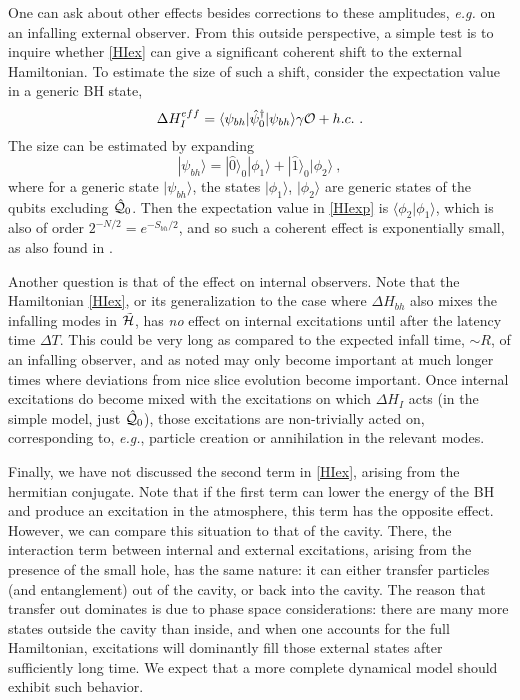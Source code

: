\documentclass[12pt]{article}
\numberwithin{equation}{section}
\newcommand{\calo}{{\cal O}}
\newcommand{\calh}{{\cal H}}
\newcommand{\calq}{{\cal Q}}
\newcommand{\beq}{\begin{equation}}
\newcommand{\eeq}{\end{equation}}
\begin{document}
One can ask about other effects besides corrections to these amplitudes, {\it e.g.} on an infalling external observer.  From this outside perspective, a simple test is to inquire whether  \eqref{HIex} can give a significant coherent shift to the external Hamiltonian.  To estimate the size of such a shift, consider the expectation value in a generic BH state,
\beq\label{HIexp}
\Delta H_I^{eff} = \langle \psi_{bh}|\hat \psi_0^\dagger| \psi_{bh}\rangle \gamma \calo + h.c.\ .
\eeq
The size can be estimated by expanding 
\beq
|\psi_{bh}\rangle = |\hat0\rangle_0 |\phi_1\rangle +  |\hat1\rangle_0  |\phi_2\rangle\ ,
\eeq
where for a generic state $|\psi_{bh}\rangle$, the states $ |\phi_1\rangle$, $ |\phi_2\rangle$ are generic states of the qubits excluding $\hat \calq_0$. Then the expectation value in \eqref{HIexp} is $\langle \phi_2|\phi_1\rangle$, which is also of order $2^{-N/2} = e^{-S_{bh}/2}$, and so such a coherent effect is exponentially small, as also found in \cite{NVU}.

Another question is that of the effect on internal observers.  Note that the Hamiltonian \eqref{HIex}, or its generalization to the case where  $\Delta H_{bh}$ also mixes  the infalling modes in $\tilde \calh$, has {\it no} effect on internal excitations until after the latency time $\Delta T$.  This could be very long as compared to the expected infall time, $\sim R$, of an infalling observer, and as noted may only become important at much longer times where deviations from nice slice evolution become important.  Once internal excitations do become mixed with the excitations on which $\Delta H_I$ acts (in the simple model, just $\hat \calq_0$), those excitations are non-trivially acted on, corresponding to, {\it e.g.}, particle creation or annihilation in the relevant modes.

Finally, we have not discussed the second term in \eqref{HIex}, arising from the hermitian conjugate.  Note that if the first term can lower the energy of the BH and produce an excitation in the atmosphere, this term has the opposite effect.  However, we can compare this situation to that of the cavity.  There, the interaction term between internal and external excitations, arising from the presence of the small hole, has the same nature: it can either transfer particles (and entanglement) out of the cavity, or back into the cavity.  The reason that transfer out dominates is due to phase space considerations:  there are many more states outside the cavity than inside, and when one accounts for the full Hamiltonian, excitations will dominantly fill those external states after sufficiently long time.  We expect that a more complete dynamical model should exhibit such behavior.
\end{document}
